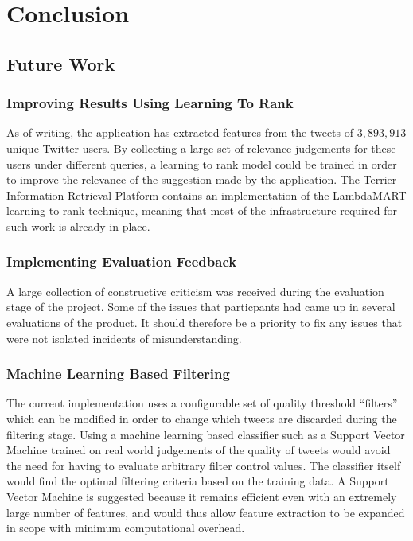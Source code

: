 \documentclass{l4proj}
\begin{document}
\chapter{Conclusion}
    
    \section{Future Work}
    
        \subsection{Improving Results Using Learning To Rank}
        As of writing, the application has extracted features from the tweets of $3,893,913$ unique Twitter users. By collecting a large set of relevance judgements for these users under different queries, a learning to rank model could be trained in order to improve the relevance of the suggestion made by the application. The Terrier Information Retrieval Platform contains an implementation of the LambdaMART learning to rank technique, meaning that most of the infrastructure required for such work is already in place.
        
        \subsection{Implementing Evaluation Feedback}
        A large collection of constructive criticism was received during the evaluation stage of the project. Some of the issues that particpants had came up in several evaluations of the product. It should therefore be a priority to fix any issues that were not isolated incidents of misunderstanding.
        
        \subsection{Machine Learning Based Filtering}
        The current implementation uses a configurable set of quality threshold ``filters'' which can be modified in order to change which tweets are discarded during the filtering stage. Using a machine learning based classifier such as a Support Vector Machine trained on real world judgements of the quality of tweets would avoid the need for having to evaluate arbitrary filter control values. The classifier itself would find the optimal filtering criteria based on the training data. A Support Vector Machine is suggested because it remains efficient even with an extremely large number of features, and would thus allow feature extraction to be expanded in scope with minimum computational overhead.
        
\end{document}
